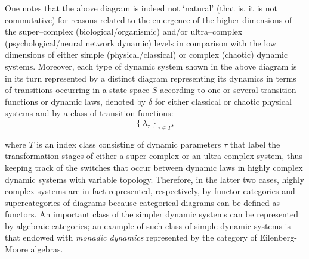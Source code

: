 \documentclass[12pt]{article}
\theoremstyle{plain}
\theoremstyle{definition}
\numberwithin{equation}{section}
\begin{document}
 One notes that the above diagram is indeed not `natural' (that is, it is not commutative) for reasons
related to the emergence of the higher dimensions of the super--complex
(biological/organismic) and/or ultra--complex (psychological/neural network dynamic) levels in comparison with
the low dimensions of either simple (physical/classical) or complex (chaotic) dynamic systems. Moreover,
each type of dynamic system shown in the above diagram is in its turn represented by a distinct diagram
representing its dynamics in terms of transitions occurring in a state space $S$ according to one or several
transition functions or dynamic laws, denoted by $\delta$ for either classical or chaotic physical systems and
by a class of transition functions: 
$$\left\{\lambda_{\tau} \right\} _{\tau \in T},$$

where $T$ is an index class consisting of dynamic parameters $\tau$ that label the transformation stages of either a super-complex or an ultra-complex system, thus keeping track of the switches that occur between dynamic laws in highly complex dynamic systems with variable topology. Therefore, in the latter two cases, highly complex systems are in fact represented, respectively, by functor categories and supercategories of diagrams because categorical diagrams can be defined as functors. An important class of the simpler dynamic systems can be represented by algebraic categories; an example of such class of simple dynamic systems is that endowed with \emph{monadic dynamics} represented by the category of Eilenberg-Moore algebras.

\end{document}
